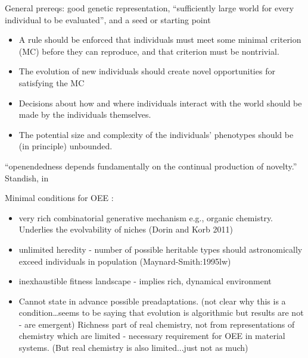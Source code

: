 			General prereqs: good genetic representation, ``sufficiently large
			world for every individual to be evaluated'', and a seed or starting
			point
			
\begin{itemize}
	\item
	
	A rule should be enforced that individuals must meet some minimal
	criterion (MC) before they can reproduce, and that criterion must be
	nontrivial.
	
	\item
	
	The evolution of new individuals should create novel opportunities
	for satisfying the MC
	
	\item
	
	Decisions about how and where individuals interact with the world
	should be made by the individuals themselves.
	
	\item
	
	The potential size and complexity of the individuals' phenotypes
	should be (in principle) unbounded.
	
\end{itemize}

			``openendedness depends fundamentally on the continual production of novelty.'' Standish, in \autocite{Soros2014}
					
			Minimal conditions for OEE \autocite{Vasas2015}:
			\begin{itemize}
				\item
				
				very rich combinatorial generative mechanism e.g., organic
				chemistry. Underlies the evolvability of niches (Dorin and Korb
				2011)
				
				\item
				
				unlimited heredity - number of possible heritable types should
				astronomically exceed individuals in population
				(Maynard-Smith:1995lw)
				
				\item
				
				inexhaustible fitness landscape - implies rich, dynamical
				environment
				
				\item
				
				Cannot state in advance possible preadaptations. (not clear why this
				is a condition\ldots{}seems to be saying that evolution is
				algorithmic but results are not - are emergent) Richness part of
				real chemistry, not from representations of chemistry which are
				limited - necessary requirement for OEE in material systems. (But
				real chemistry is also limited...just not as much)
				
			\end{itemize}
			
